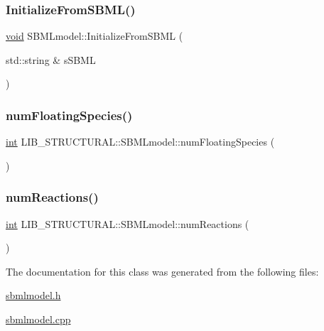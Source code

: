 \subsubsection{\texorpdfstring{Initialize\+From\+S\+B\+M\+L()}{InitializeFromSBML()}}
{\footnotesize\ttfamily \hyperlink{lp__lib_8h_ac7828c7b2b31d2e11af17bdb6289c5d9}{void} S\+B\+M\+Lmodel\+::\+Initialize\+From\+S\+B\+ML (\begin{DoxyParamCaption}\item[{std\+::string \&}]{s\+S\+B\+ML }\end{DoxyParamCaption})}

\mbox{\label{class_l_i_b___s_t_r_u_c_t_u_r_a_l_1_1_s_b_m_lmodel_a8034301c2a1708f55bbe8ba1f35a467b}} 
\subsubsection{\texorpdfstring{num\+Floating\+Species()}{numFloatingSpecies()}}
{\footnotesize\ttfamily \hyperlink{lp__lib_8h_adeb9ec6400320e4923ac9d836d509ddb}{int} L\+I\+B\+\_\+\+S\+T\+R\+U\+C\+T\+U\+R\+A\+L\+::\+S\+B\+M\+Lmodel\+::num\+Floating\+Species (\begin{DoxyParamCaption}{ }\end{DoxyParamCaption})\hspace{0.3cm}{\ttfamily [inline]}}

\mbox{\label{class_l_i_b___s_t_r_u_c_t_u_r_a_l_1_1_s_b_m_lmodel_abe88629d5ee1763dcc91e8a6a7adcdde}} 
\subsubsection{\texorpdfstring{num\+Reactions()}{numReactions()}}
{\footnotesize\ttfamily \hyperlink{lp__lib_8h_adeb9ec6400320e4923ac9d836d509ddb}{int} L\+I\+B\+\_\+\+S\+T\+R\+U\+C\+T\+U\+R\+A\+L\+::\+S\+B\+M\+Lmodel\+::num\+Reactions (\begin{DoxyParamCaption}{ }\end{DoxyParamCaption})\hspace{0.3cm}{\ttfamily [inline]}}



The documentation for this class was generated from the following files\+:\begin{DoxyCompactItemize}
\item 
\hyperlink{sbmlmodel_8h}{sbmlmodel.\+h}\item 
\hyperlink{sbmlmodel_8cpp}{sbmlmodel.\+cpp}\end{DoxyCompactItemize}
